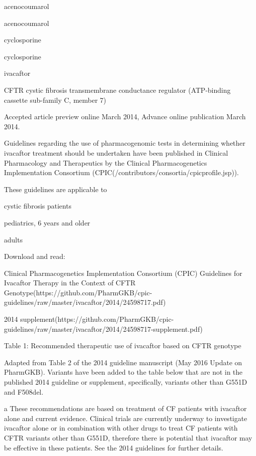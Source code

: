 \documentclass{resume} %
\begin{document}
\begin{rSection}{ acenocoumarol }
\begin{rSection}{ acenocoumarol }
\begin{rSection}{ cyclosporine }
\begin{rSection}{ cyclosporine }
\begin{rSection}{ ivacaftor }
\begin{rSubsection}{ CFTR }{ cystic fibrosis transmembrane conductance regulator (ATP-binding cassette sub-family C, member 7) }{}{}
\item Accepted article preview online March 2014,  Advance online publication March 2014.
 \newline
\item Guidelines regarding the use of pharmacogenomic tests in determining whether ivacaftor treatment should be undertaken have been published in Clinical Pharmacology and Therapeutics by the Clinical Pharmacogenetics Implementation Consortium (CPIC(/contributors/consortia/cpicprofile.jsp)). 
 \newline
\item These guidelines are applicable to 
 \newline
\item cystic fibrosis patients
 \newline
\item pediatrics, 6 years and older
 \newline
\item adults
 \newline
\item Download and read:
 \newline
\item Clinical Pharmacogenetics Implementation Consortium (CPIC) Guidelines for Ivacaftor Therapy in the Context of CFTR Genotype(https://github.com/PharmGKB/cpic-guidelines/raw/master/ivacaftor/2014/24598717.pdf) 
 \newline
\item 2014 supplement(https://github.com/PharmGKB/cpic-guidelines/raw/master/ivacaftor/2014/24598717-supplement.pdf)
 \newline
\item Table 1: Recommended therapeutic use of ivacaftor based on CFTR genotype
 \newline
\item Adapted from Table 2 of the 2014 guideline manuscript (May 2016 Update on PharmGKB).  Variants have been added to the table below that are not in the published 2014 guideline or supplement,  specifically, variants other than G551D and F508del.
 \newline
\item a These recommendations are based on treatment of CF patients with ivacaftor alone and current evidence. Clinical trials are currently underway to investigate ivacaftor alone or in combination with other drugs to treat CF patients with CFTR variants other than G551D, therefore there is potential that ivacaftor may be effective in these patients. See the 2014 guidelines for further details.

\end{rSubsection}
\end{rSection}
\end{rSection}
\end{rSection}
\end{rSection}
\end{rSection}
\end{document}
